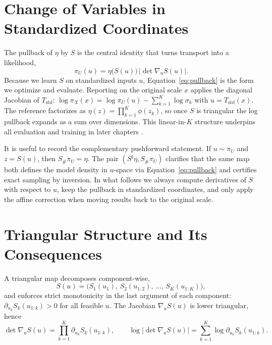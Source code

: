 \documentclass[11pt,a4paper,twoside]{book}\usepackage[]{graphicx}\usepackage[]{xcolor}
\begin{document}
\section{Change of Variables in Standardized Coordinates}

The pullback of $\eta$ by $S$ is the central identity that turns transport into a likelihood,
\begin{equation}
  \pi_U(u) = \eta\big(S(u)\big)\, \big|\det \nabla_u S(u)\big|.
  \label{eq:pullback}
\end{equation}
Because we learn $S$ on standardized inputs $u$, Equation~\eqref{eq:pullback} is the form we optimize and evaluate. Reporting on the original scale $x$ applies the diagonal Jacobian of $T_{\mathrm{std}}$: $\log \pi_X(x)=\log \pi_U(u)-\sum_{k=1}^K \log \sigma_k$ with $u=T_{\mathrm{std}}(x)$. The reference factorizes as $\eta(z)=\prod_{k=1}^K \phi(z_k)$, so once $S$ is triangular the log pullback expands as a sum over dimensions. This linear-in-$K$ structure underpins all evaluation and training in later chapters \citep{ramgraber2025friendly}.

It is useful to record the complementary pushforward statement. If $u\sim \pi_U$ and $z=S(u)$, then $S_{\#}\pi_U=\eta$. The pair $(S^{\sharp}\eta, S_{\#}\pi_U)$ clarifies that the same map both defines the model density in $u$-space via Equation~\eqref{eq:pullback} and certifies exact sampling by inversion. In what follows we always compute derivatives of $S$ with respect to $u$, keep the pullback in standardized coordinates, and only apply the affine correction when moving results back to the original scale.

\section{Triangular Structure and Its Consequences}

A triangular map decomposes component-wise,
\begin{equation}
  S(u) = \big(S_1(u_1),\,S_2(u_{1:2}),\,\ldots,\,S_K(u_{1:K})\big),
  \label{eq:triangular-map}
\end{equation}
and enforces strict monotonicity in the last argument of each component: $\partial_{u_k}S_k(u_{1:k})>0$ for all feasible $u$. The Jacobian $\nabla_u S(u)$ is lower triangular, hence
\begin{equation}
  \det\nabla_u S(u)=\prod_{k=1}^K \partial_{u_k}S_k(u_{1:k}),
  \qquad
  \log \big|\det\nabla_u S(u)\big| = \sum_{k=1}^K \log \partial_{u_k}S_k(u_{1:k}).
  \label{eq:triangular-det}
\end{equation}
\end{document}
